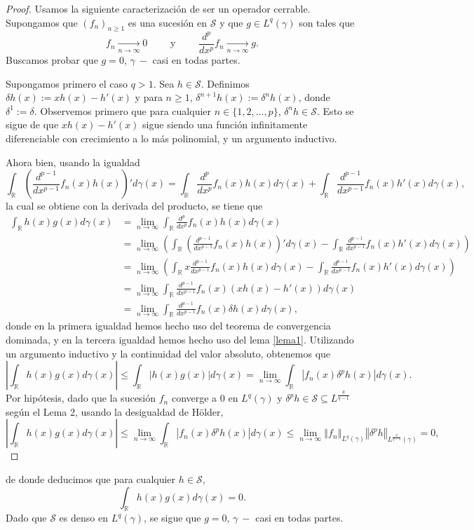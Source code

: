 \documentclass[letterpaper,twoside,12pt]{book}
\newcommand{\R}{\mathbb{R}}
\renewcommand{\S}{\mathcal{S}}
\newcommand{\1}{\mathds{1}}
\newcommand{\abs}[1]{\left\lvert #1 \right\rvert}
\renewcommand{\to}{\rightarrow}
\newcommand{\norm}[1]{\left\Vert #1 \right\Vert}
\theoremstyle{definition}
\theoremstyle{definition}
\theoremstyle{remark}
\theoremstyle{definition}
\theoremstyle{definition}
\theoremstyle{definition}
\theoremstyle{definition}
\theoremstyle{definition}
\begin{document}
\begin{proof} 
  Usamos la siguiente caracterización de ser un operador cerrable. Supongamos que $(f_n)_{n\geq1}$ es una sucesión en $\S$ y que $g\in L^{q}(\gamma)$ son tales que 
  \[
  f_n\xrightarrow[n\to \infty]{}0 \qquad \text{ y } \qquad \frac{d^{p}}{dx^{p}}f_n\xrightarrow[n\to \infty]{}g.
  \] 
   Buscamos probar que $g=0$, $\gamma \ - $ casi en todas partes.
   
   Supongamos primero el caso $q>1$. Sea $h\in \S$. Definimos $\delta h(x):=xh(x)-h'(x)$ y para $n\geq1$, $\delta^{n+1}h(x):=\delta^{n} h(x)$, donde $\delta^{1}:=\delta$. Observemos primero que para cualquier $n\in \{1,2,...,p\}$, $\delta^{n}h\in \S$. Esto se sigue de que $xh(x)-h'(x)$ sigue siendo una función infinitamente diferenciable con crecimiento a lo más polinomial, y un argumento inductivo.
   
   Ahora bien, usando la igualdad
   \[
   \int_\R \left(\frac{d^{p-1}}{dx^{p-1}}f_n(x)h(x)\right)'d\gamma(x)=\int_\R \frac{d^{p}}{dx^{p}}f_n(x)h(x)d\gamma(x) +\int _\R \frac{d^{p-1}}{dx^{p-1}}f_n(x)h'(x)d\gamma(x),
   \] 
   la cual se obtiene con la derivada del producto, se tiene que 
   \begin{align*}
       \int_{\R}h(x)g(x)d\gamma(x)&=\lim_{n\to\infty}\int_\R \frac{d^{p}}{dx^{p}}f_n(x) h(x) d\gamma(x)\\
       &=\lim_{n\to\infty}\left(\int_\R \left(\frac{d^{p-1}}{dx^{p-1}}f_n(x)h(x)\right)'d\gamma(x)-\int _\R \frac{d^{p-1}}{dx^{p-1}}f_n(x)h'(x)d\gamma(x)\right)\\
       &=\lim_{n\to\infty}\left(\int_\R x\frac{d^{p-1}}{dx^{p-1}}f_n(x)h(x)d\gamma(x)-\int _\R \frac{d^{p-1}}{dx^{p-1}}f_n(x)h'(x)d\gamma(x)\right)\\
       &=\lim_{n\to\infty}\int_\R \frac{d^{p-1}}{dx^{p-1}}f_n(x) \left(xh(x)-h'(x)\right) d\gamma(x)\\
       &=\lim_{n\to\infty}\int_\R \frac{d^{p-1}}{dx^{p-1}}f_n(x) \delta h(x) d\gamma(x),
   \end{align*}
   donde en la primera igualdad hemos hecho uso del teorema de convergencia dominada, y en la tercera igualdad hemos hecho uso del lema \ref{lema1}. Utilizando un argumento inductivo y la continuidad del valor absoluto, obtenemos que 
   \[
       \abs{\int_{\R}h(x)g(x)d\gamma(x)}\leq\int_{\R}\abs{h(x)g(x)} d\gamma(x)=\lim_{n\to\infty}\int_\R \abs{f_n(x) \delta^{p} h(x)} d\gamma(x).
   \]
   Por hipótesis, dado que la sucesión $f_n$ converge a 0 en $L^{q}(\gamma)$ y $\delta^{p}h \in \S\subseteq L^{\frac{q}{q-1}}$ según el Lema 2, usando la desigualdad de Hölder, 
    \[
       \abs{\int_{\R}h(x)g(x)d\gamma(x)}\leq\lim_{n\to\infty}\int_\R |f_n(x) \delta^{p} h(x)| d\gamma(x)\leq \lim_{n\to \infty}\norm{f_n}_{L^{q}(\gamma)}\norm{\delta^{p}h}_{L^{\frac{q}{q-1}}(\gamma)}=0,
    \]
 \end{proof}
 de donde deducimos que para cualquier $h\in \S$, 
 \[
 \int_{\R}h(x)g(x)d\gamma(x)=0.
 \]
 Dado que $\S$ es denso en $L^{q}(\gamma)$, se sigue que $g=0$, $\gamma \ - $ casi en todas partes.
\end{document}
